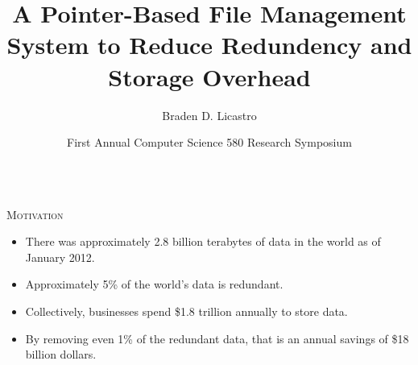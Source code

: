 \documentclass[final,t]{beamer}
\title{A Pointer-Based File Management System to Reduce Redundency and Storage Overhead}
\author[Licastro]{Braden D. Licastro}
\institute{Department of Computer Science, Allegheny College}
\date[CSRS 2013] {First Annual Computer Science 580 Research Symposium}
\begin{document}
  \begin{frame}{}  
  \vspace*{-6mm}
  	\begin{columns}[t]

%
%
      \begin{column}{.325\linewidth}

	    
	    
			

        \begin{block}{\textsc{Motivation}}

      	  \begin{itemize}
          
            \item There was approximately 2.8 billion terabytes of data in the world as of January 2012.

            \item Approximately 5\% of the world's data is redundant.
            
            \item Collectively, businesses spend \$1.8 trillion annually to store data.
            
            \item By removing even 1\% of the redundant data, that is an annual savings of \$18 billion dollars.
          
          \end{itemize}


\end{block}
\end{column}
\end{columns}
\end{frame}
\end{document}

